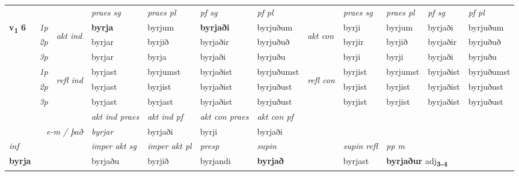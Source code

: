 \begin{longtable}[l]{X>{\footnotesize\itshape}llXXXXlXXXX}
\midrule

 & &   & \textit{praes sg}  & \textit{praes pl}    & \textit{ pf sg} & \textit{pf pl} & & \textit{praes sg}  & \textit{praes pl}    & \textit{pf sg} & \textit{pf pl }  \\ \cmidrule{4-7} \cmidrule{9-12}
 \multirow{2}{*}{{{\textbf{v{\textsubscript{1}}} \Large{\textbf{6}}}}}  & 1p & \multirow{3}{*}{\begin{turn}{90}\textit{akt ind}\end{turn}} & \textbf{byrja} & byrjum & \textbf{byrjaði} & byrjuðum & \multirow{3}{*}{\begin{turn}{90}\textit{akt con}\end{turn}} &byrji & byrjum & byrjaði & byrjuðum\\*
 & 2p &  &  byrjar  & byrjið & byrjaðir & byrjuðuð & & byrjir & byrjið & byrjaðir & byrjuðuð \\*
 & 3p &  & byrjar & byrja & byrjaði & byrjuðu & & byrji & byrji& byrjaði & byrjuðu \\*
\cmidrule{4-7} \cmidrule{9-12}
 & 1p & \multirow{3}{*}{\begin{turn}{90}\textit{refl ind}\end{turn}}  & byrjast & byrjumst & byrjaðist & byrjuðumst & \multirow{3}{*}{\begin{turn}{90}\textit{refl con}\end{turn}}  &byrjist & byrjumst & byrjaðist & byrjuðumst \\*
 & 2p &  & byrjast & byrjist & byrjaðist & byrjuðust & &byrjist & byrjist & byrjaðist & byrjuðust \\*
 & 3p  & & byrjast & byrjast & byrjaðist & byrjuðust & & byrjist & byrjist& byrjaðist & byrjuðust \\*
\cmidrule{4-7} \cmidrule{9-12}

   && &  \textit{akt ind praes} & \textit{akt ind pf} & \textit{akt con praes} & \textit{akt con pf} \\*
\multicolumn{3}{r}{\textit{e-m / það}} & byrjar & byrjaði & byrji & byrjaði \\*

\cmidrule{4-7}
   {\textit{inf}} & &  & \textit{imper akt sg} & \textit{imper akt pl}   & \textit{presp} & \textit{supin} && \textit{supin refl} & \textit{pp m} \\*
  {\textbf{byrja}} & && byrjaðu  & byrjið   & byrjandi &  \textbf{byrjað} && byrjast & \multicolumn{2}{l}{\textbf{byrjaður} adj\textbf{\textsubscript{3-4}}} \\*


\end{longtable}
